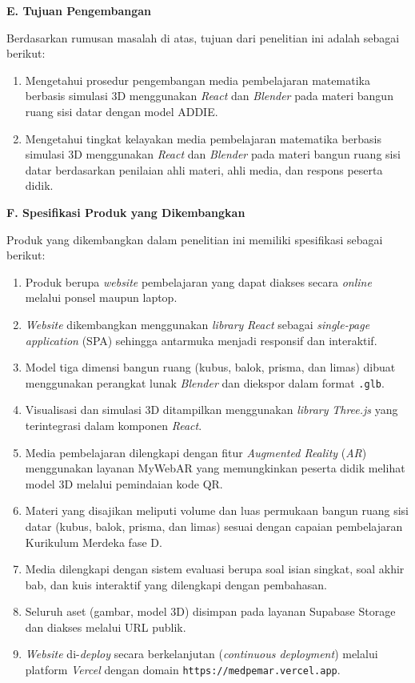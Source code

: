 \textbf{E. Tujuan Pengembangan}

\hspace*{1cm}Berdasarkan rumusan masalah di atas, tujuan dari penelitian ini adalah sebagai berikut:
\begin{enumerate}
    \item Mengetahui prosedur pengembangan media pembelajaran matematika berbasis simulasi 3D menggunakan \textit{React} dan \textit{Blender} pada materi bangun ruang sisi datar dengan model ADDIE.
    \item Mengetahui tingkat kelayakan media pembelajaran matematika berbasis simulasi 3D menggunakan \textit{React} dan \textit{Blender} pada materi bangun ruang sisi datar berdasarkan penilaian ahli materi, ahli media, dan respons peserta didik.
\end{enumerate}

\textbf{F. Spesifikasi Produk yang Dikembangkan}

\hspace*{1cm}Produk yang dikembangkan dalam penelitian ini memiliki spesifikasi sebagai berikut:
\begin{enumerate}
    \item Produk berupa \textit{website} pembelajaran yang dapat diakses secara \textit{online} melalui ponsel maupun laptop.
    \item \textit{Website} dikembangkan menggunakan \textit{library} \textit{React} sebagai \textit{single-page application} (SPA) sehingga antarmuka menjadi responsif dan interaktif.
    \item Model tiga dimensi bangun ruang (kubus, balok, prisma, dan limas) dibuat menggunakan perangkat lunak \textit{Blender} dan diekspor dalam format \texttt{.glb}.
    \item Visualisasi dan simulasi 3D ditampilkan menggunakan \textit{library} \textit{Three.js} yang terintegrasi dalam komponen \textit{React}.
    \item Media pembelajaran dilengkapi dengan fitur \textit{Augmented Reality} (\textit{AR}) menggunakan layanan MyWebAR yang memungkinkan peserta didik melihat model 3D melalui pemindaian kode QR.
    \item Materi yang disajikan meliputi volume dan luas permukaan bangun ruang sisi datar (kubus, balok, prisma, dan limas) sesuai dengan capaian pembelajaran Kurikulum Merdeka fase D.
    \item Media dilengkapi dengan sistem evaluasi berupa soal isian singkat, soal akhir bab, dan kuis interaktif yang dilengkapi dengan pembahasan.
    \item Seluruh aset (gambar, model 3D) disimpan pada layanan Supabase Storage dan diakses melalui URL publik.
    \item \textit{Website} di-\textit{deploy} secara berkelanjutan (\textit{continuous deployment}) melalui platform \textit{Vercel} dengan domain \texttt{https://medpemar.vercel.app}.
\end{enumerate}

